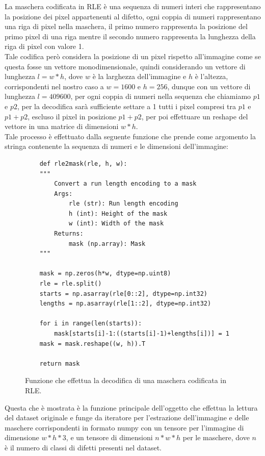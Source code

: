 La maschera codificata in RLE è una sequenza di numeri interi che rappresentano la posizione dei pixel appartenenti al difetto,
ogni coppia di numeri rappresentano una riga di pixel nella maschera, il primo numero rappresenta la posizione del primo pixel
di una riga mentre il secondo numero rappresenta la lunghezza della riga di pixel con valore 1.\\
Tale codifica però considera la posizione di un pixel rispetto all'immagine come se questa fosse un vettore monodimensionale,
quindi considerando un vettore di lunghezza $l = w * h$, dove $w$ è la larghezza dell'immagine e $h$ è l'altezza, corrispondenti nel nostro caso
a $w = 1600$ e $h = 256$, dunque con un vettore di lunghezza $l = 409600$, per ogni coppia di numeri nella sequenza che chiamiamo $p1$ e $p2$,
per la decodifica sarà sufficiente settare a 1 tutti i pixel compresi tra $p1$ e $p1 + p2$, escluso il pixel in posizione $p1 + p2$,
per poi effettuare un reshape del vettore in una matrice di dimensioni $w * h$.\\
Tale processo è effettuato dalla seguente funzione che prende come argomento la stringa contenente la sequenza di numeri e le dimensioni dell'immagine:

\begin{figure}[H]
    \begin{verbatim}
    def rle2mask(rle, h, w):
    """
        Convert a run length encoding to a mask
        Args:
            rle (str): Run length encoding
            h (int): Height of the mask
            w (int): Width of the mask
        Returns:
            mask (np.array): Mask
    """

    mask = np.zeros(h*w, dtype=np.uint8)
    rle = rle.split()
    starts = np.asarray(rle[0::2], dtype=np.int32)
    lengths = np.asarray(rle[1::2], dtype=np.int32)

    for i in range(len(starts)):
        mask[starts[i]-1:((starts[i]-1)+lengths[i])] = 1
    mask = mask.reshape((w, h)).T

    return mask
    \end{verbatim}
    \caption{Funzione che effettua la decodifica di una maschera codificata in RLE.}
\end{figure}

Questa che è mostrata è la funzione principale dell'oggetto che effettua la lettura del dataset originale e funge da iteratore 
per l'estrazione dell'immagine e delle maschere corrispondenti in formato numpy con un tensore per l'immagine di dimensione $w * h * 3$, 
e un tensore di dimensioni $n * w * h$ per le maschere, dove $n$ è il numero di classi di difetti presenti nel dataset.


